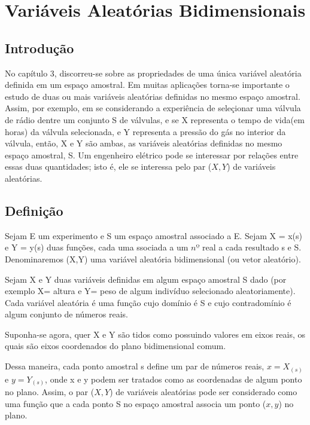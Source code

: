 \documentclass[a4paper,12pt]{report}
\begin{document}
{\chapter{Variáveis Aleatórias Bidimensionais}

\section{Introdução}

 No capítulo 3, discorreu-se sobre as propriedades de uma única
 variável aleatória definida em um espaço amostral. Em muitas
 aplicações torna-se importante o estudo de duas ou mais variáveis
 aleatórias definidas no mesmo espaço amostral. Assim, por
 exemplo, em se considerando a experiência de seleçionar uma
 válvula de rádio dentre um conjunto S de válvulas, e se X
 representa o tempo de vida(em horas) da válvula selecionada, e Y
 representa a pressão do gás no interior da válvula, então, X e Y
 são ambas, as variáveis aleatórias definidas no mesmo espaço
 amostral, S. Um engenheiro elétrico pode se interessar por
 relações entre essas duas quantidades; isto é, ele se interessa
 pelo par ($X,Y$) de variáveis aleatórias.

\section{Definição}

Sejam  E um experimento e S um espaço amostral associado a
 E. Sejam X = x(s) e Y = y(s) duas funções, cada uma ssociada a um
 $nº$ real a cada resultado s e S. Denominaremos (X,Y) uma
 variável aleatória bidimensional (ou vetor aleatório).\vskip0.3cm


Sejam X e Y duas variáveis definidas em algum espaço amostral S
dado (por exemplo X= altura e Y= peso de algum indivíduo
selecionado aleatoriamente). Cada variável aleatória é uma função
cujo domínio é S e cujo contradomínio é algum conjunto de números
reais.\vskip0.3cm

Suponha-se agora, quer X e Y são tidos como possuindo valores em
eixos reais, os quais são eixos coordenados do plano bidimensional
comum.\vskip0.3cm

Dessa maneira, cada ponto amostral s define um par de números
reais, $x=X_{(s)}$ e $y=Y_{(s)}$, onde x e y podem ser tratados
como as coordenadas de algum ponto no plano. Assim, o par ($X,Y$)
de variáveis aleatórias pode ser considerado como uma função que a
cada ponto S no espaço amostral associa um ponto ($x,y$) no plano.



}
\end{document}
